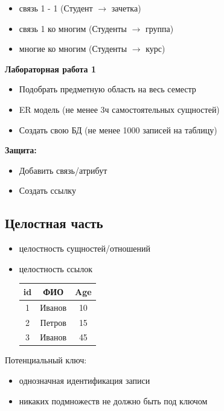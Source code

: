 \documentclass[a4paper, 14pt]{report}
\begin{document}
\begin{itemize}
    \item связь 1 - 1 (Студент $\to$ зачетка)
    \item связь 1 ко многим (Студенты $\to$ группа)
    \item многие ко многим (Студенты $\to$ курс)
\end{itemize}

\begin{lbox}{\textbf{Лабораторная работа 1}}
    \begin{itemize}
        \item Подобрать предметную область на весь семестр
        \item ER модель (не менее 3ч самостоятельных сущностей)
        \item Создать свою БД (не менее 1000 записей на таблицу)
    \end{itemize}
    \textbf{Защита:}
    \begin{itemize}
        \item Добавить связь/атрибут
        \item Создать ссылку
    \end{itemize}
\end{lbox}

\subsection{Целостная часть}

\begin{itemize}
    \item целостность сущностей/отношений
    \item целостность ссылок

        \begin{tabular}{|c|c|c|}
            \hline
            id & ФИО & Age \\
            \hline
            1 & Иванов & 10 \\
            \hline
            2 & Петров & 15 \\
            \hline
            3 & Иванов & 45 \\
            \hline
        \end{tabular}
\end{itemize}

Потенциальный ключ:

\begin{itemize}
    \item однозначная идентификация записи
    \item никаких подмножеств не должно быть под ключом
\end{itemize}
\end{document}
